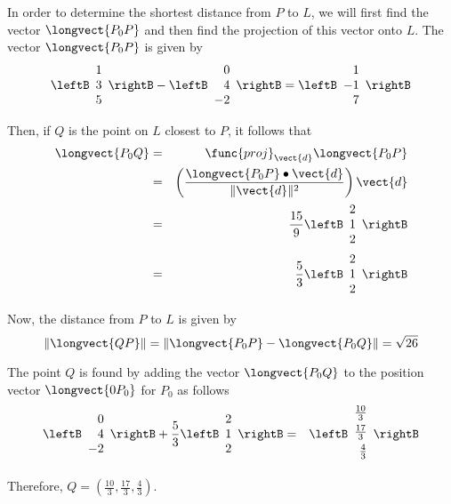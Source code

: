 \begin{solution}
In order to determine the shortest distance from $P$ to $L$, we will first find the vector $\longvect{P_0P}$ and then find the projection of this vector onto $L$. 
The vector $\longvect{P_0P}$ is given by 
\[
\leftB
\begin{array}{r}
1 \\
3 \\
5
\end{array}
\rightB
-
\leftB
\begin{array}{r}
0 \\
4 \\
-2
\end{array}
\rightB
 = \leftB
\begin{array}{r}
1 \\
-1 \\
7
\end{array}
\rightB
\]

Then, if $Q$ is the point on $L$ closest to $P$, it follows that 
\begin{eqnarray*}
\longvect{P_0Q} &=& \func{proj}_{\vect{d}}\longvect{P_0P} \\
&=& \left( \frac{ \longvect{P_0P}\bullet \vect{d}}{\|\vect{d}\|^2}\right) \vect{d} \\
&=& 
\frac{15}{9} \leftB
\begin{array}{r}
2 \\
1 \\
2
\end{array}
\rightB \\
&=&
\frac{5}{3} \leftB
\begin{array}{r}
2 \\
1 \\
2
\end{array}
\rightB
\end{eqnarray*}

Now, the distance from $P$ to $L$ is given by 
\[
\| \longvect{QP} \| = \| \longvect{P_0P} - \longvect{P_0Q}\|
 = \sqrt{26} 
\]

The point $Q$ is found by adding the vector $\longvect{P_0Q}$ to the position vector $\longvect{0P_0}$ for $P_0$ as follows
\begin{eqnarray*}
\leftB
\begin{array}{r}
0 \\
4 \\
-2
\end{array}
\rightB
+
\frac{5}{3}
\leftB
\begin{array}{r}
2 \\
1 \\
2
\end{array}
\rightB 
&=& 
\leftB
\begin{array}{r}
\vspace{0.05in}\frac{10}{3} \\
\vspace{0.05in}\frac{17}{3} \\
\vspace{0.05in}\frac{4}{3}
\end{array}
\rightB
\end{eqnarray*}

Therefore, $Q = (\frac{10}{3}, \frac{17}{3}, \frac{4}{3})$. 

\end{solution}